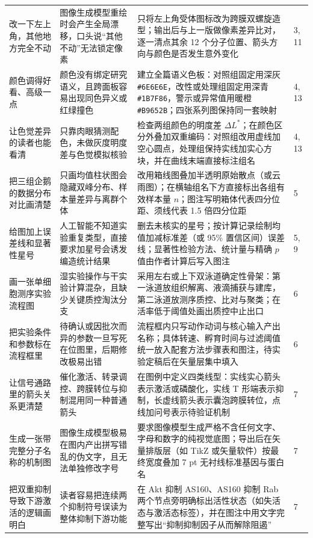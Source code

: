 \begin{longtable}{@{}p{26mm}p{28mm}p{56mm}p{10mm}@{}}
改一下左上角，其他地方完全不动 & 图像生成模型重绘时会产生全局漂移，口头说“其他不动”无法锁定像素 & 只将左上角受体图标改为跨膜双螺旋造型；输出后与上一版做像素差异比对，逐一清点其余 12 个分子位置、箭头方向与颜色是否发生意外变化 & 3, 11 \\
颜色调得好看、高级一点 & 颜色没有绑定研究语义，且跨面板容易出现同色异义或红绿撞色 & 建立全篇语义色板：对照组固定用深灰 \texttt{\#6E6E6E}，改性或处理组固定用深青 \texttt{\#1B7F86}，警示或异常值用暖橙 \texttt{\#B9652B}；四张系列图保持同一套映射 & 4, 13 \\
让色觉差异的读者也能看清 & 只靠肉眼猜测配色，未做灰度明度差与色觉模拟核验 & 检查两组颜色的明度差 $\Delta L^*$；在颜色区分外叠加双重编码：对照组改用虚线加空心圆点，处理组保持实线加实心方块，并在曲线末端直接标注组名 & 4, 13 \\
把三组企鹅的数据分布对比画清楚 & 只画均值柱状图会隐藏双峰分布、样本量差异与离群个体 & 改用箱线图叠加半透明原始散点（或云雨图）；在横轴组名下方直接标出各组有效样本量 $n$；图注写明箱体代表四分位距、须线代表 1.5 倍四分位距 & 5 \\
给图加上误差线和显著性星号 & 人工智能不知道实验重复类型，直接要求加星号会诱发编造统计结果 & 删去未核实的星号；按计算记录绘制均值加减标准差（或 95\% 置信区间）误差线；显著性检验方法、统计量与精确 $p$ 值由作者计算后写入图注 & 5, 9 \\
画一张单细胞测序实验流程图 & 湿实验操作与干实验计算混杂，且缺少关键质控淘汰分支 & 采用左右或上下双泳道确定性骨架：第一泳道放组织解离、液滴捕获与建库，第二泳道放测序质控、比对与聚类；在活率低于阈值处画出质控中止出口 & 6 \\
把实验条件和参数标在流程框里 & 待确认或因批次而异的参数一旦写死在位图里，后期修改极易出错 & 流程框内只写动作动词与核心输入产出名称；具体转速、孵育时间与过滤阈值统一放入配套方法步骤表和图注，待实验定稿后在矢量层集中填入 & 6 \\
让信号通路里的箭头关系更清楚 & 催化激活、转录调控、跨膜转位与抑制混用同一种普通箭头 & 在图例中定义四类线型：实线实心箭头表示激活或磷酸化，实线 T 形端表示抑制，长虚线箭头表示囊泡跨膜转位，点线加问号表示待验证机制 & 7 \\
生成一张带完整分子名称的机制图 & 图像生成模型极易在图内产出拼写错乱的伪文字，且无法单独修改字号 & 要求图像模型生成严格不含任何文字、字母和数字的纯视觉底图；导出后在矢量排版层（如 TikZ 或矢量软件）按最终宽度叠加 7 pt 无衬线标准基因与蛋白名 & 7 \\
把双重抑制导致下游激活的逻辑画明白 & 读者容易把连续两个抑制符号误读为整体抑制下游功能 & 在 Akt 抑制 AS160、AS160 抑制 Rab 两个节点旁明确标出活性状态（如失活态与激活态标签），并在图注中用文字完整写出“抑制抑制因子从而解除阻遏” & 7 \\

\end{longtable}
